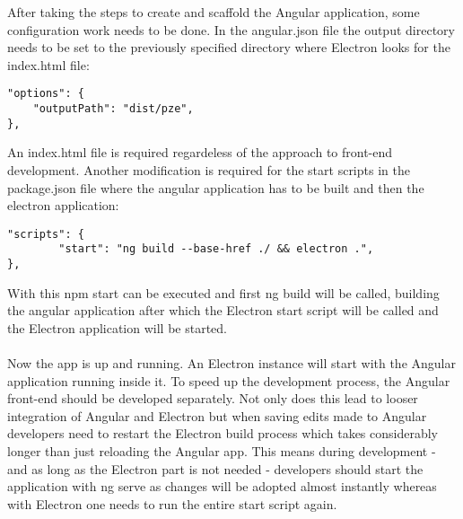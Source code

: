  
After taking the steps to create and scaffold the Angular application, some configuration work needs to be done.
In the angular.json file the output directory needs to be set to the previously specified directory where 
Electron looks for the index.html file:
\begin{lstlisting}[caption=Angular configuration for Electron]
"options": {
    "outputPath": "dist/pze",
},
\end{lstlisting}
An index.html file is required regardeless of the approach to front-end development.
Another modification is required for the start scripts in the package.json file where the angular application has to be built 
and then the electron application:
\begin{lstlisting}[caption=Start scripts for Electron and Angular]
"scripts": {
        "start": "ng build --base-href ./ && electron .",
},
\end{lstlisting}
With this npm start can be executed and first ng build will be called, building the angular application after which the 
Electron start script will be called and the Electron application will be started.\paragraph{}
Now the app is up and running. 
An Electron instance will start with the Angular application running inside it. 
To speed up the development process, the Angular front-end should be developed separately. 
Not only does this lead to looser integration of Angular and Electron but when saving edits made to Angular 
developers need to restart the Electron build process which takes considerably longer than just reloading 
the Angular app. 
This means during development - and as long as the Electron part is not needed - developers should start the 
application with ng serve as changes will be adopted almost instantly whereas with Electron one needs to run the 
entire start script again.\paragraph{}